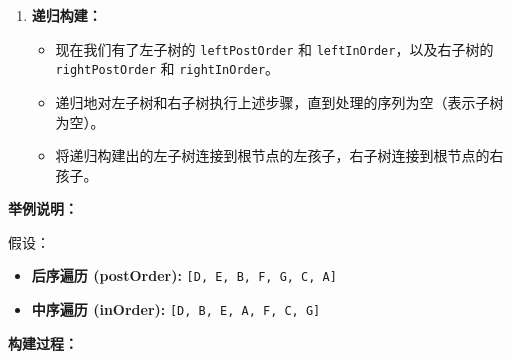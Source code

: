 \begin{enumerate}
\begin{itemize}
\begin{itemize}
		\end{itemize}
	\end{itemize}
	\item \textbf{递归构建：}
	\begin{itemize}
		\item 现在我们有了左子树的 \lstinline{leftPostOrder} 和 \lstinline{leftInOrder}，以及右子树的 \lstinline{rightPostOrder} 和 \lstinline{rightInOrder}。
		\item 递归地对左子树和右子树执行上述步骤，直到处理的序列为空（表示子树为空）。
		\item 将递归构建出的左子树连接到根节点的左孩子，右子树连接到根节点的右孩子。
	\end{itemize}
\end{enumerate}

\textbf{举例说明：}

假设：

\begin{itemize}
	\item \textbf{后序遍历 (postOrder):} \lstinline{[D, E, B, F, G, C, A]}
	\item \textbf{中序遍历 (inOrder):} \lstinline{[D, B, E, A, F, C, G]}
\end{itemize}

\textbf{构建过程：}


